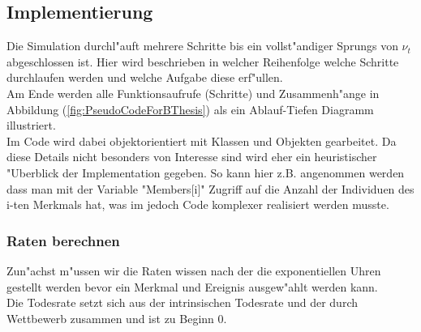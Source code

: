 \documentclass[11pt, a4paper, german]{article}
\theoremstyle{plain}
\begin{document}
	\subsection{Implementierung}
	Die Simulation durchl"auft mehrere Schritte bis ein vollst"andiger Sprungs von $ \nu_t $ abgeschlossen ist. Hier wird beschrieben in welcher Reihenfolge welche Schritte durchlaufen werden und welche Aufgabe diese erf"ullen.\\
	Am Ende werden alle Funktionsaufrufe (Schritte) und Zusammenh"ange in Abbildung (\ref{fig:PseudoCodeForBThesis}) als ein Ablauf-Tiefen Diagramm illustriert.\\
	Im Code wird dabei objektorientiert mit Klassen und Objekten gearbeitet. Da diese Details nicht besonders von Interesse sind wird eher ein heuristischer "Uberblick der Implementation gegeben. So kann hier z.B. angenommen werden dass man mit der Variable "{}Members[i]"{} Zugriff auf die Anzahl der Individuen des i-ten Merkmals hat, was im jedoch Code komplexer realisiert werden musste.\\
	
	\subsubsection{Raten berechnen}	
	Zun"achst m"ussen wir die Raten wissen nach der die exponentiellen Uhren gestellt werden bevor ein Merkmal und Ereignis ausgew"ahlt werden kann.\\
	Die Todesrate setzt sich aus der intrinsischen Todesrate und der durch Wettbewerb zusammen und ist zu Beginn 0.\\
	
\end{document}
